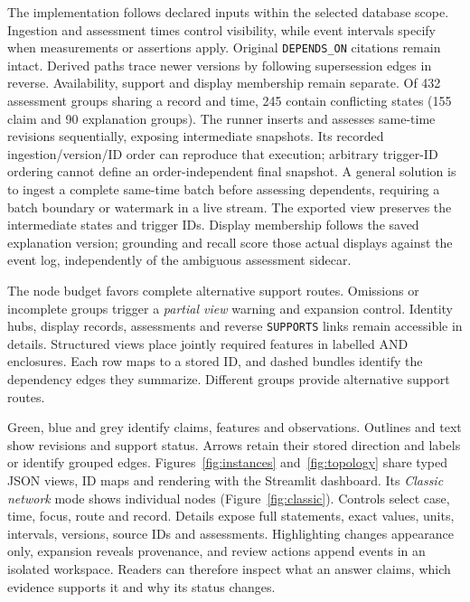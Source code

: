 \documentclass[runningheads]{llncs}
\newcommand{\SemAssessmentTies}{432}
\newcommand{\SemAssessmentConflicts}{245}
\begin{document}
The implementation follows declared inputs within the selected database
scope. Ingestion and assessment times control visibility, while event
intervals specify when measurements or assertions apply.
Original \texttt{DEPENDS\_ON} citations remain intact. Derived paths trace
newer versions by following supersession edges in reverse.
Availability, support and display membership remain separate.
Of \SemAssessmentTies{} assessment groups sharing a record and time,
\SemAssessmentConflicts{} contain conflicting states (155 claim and 90
explanation groups). The runner inserts and assesses same-time revisions
sequentially, exposing intermediate snapshots. Its recorded ingestion/version/ID
order can reproduce that execution; arbitrary trigger-ID ordering cannot define
an order-independent final snapshot. A general solution is to ingest a complete
same-time batch before assessing dependents, requiring a batch boundary or
watermark in a live stream. The exported view preserves the intermediate states
and trigger IDs. Display membership follows the saved explanation version;
grounding and recall score those actual displays against the event log,
independently of the ambiguous assessment sidecar.

The node budget favors complete alternative support routes.
Omissions or incomplete groups trigger a \emph{partial view} warning
and expansion control. Identity hubs, display records, assessments and
reverse \texttt{SUPPORTS} links remain accessible in details.
Structured views place jointly required features in labelled AND
enclosures. Each row maps to a stored ID, and dashed bundles identify
the dependency edges they summarize. Different groups provide alternative
support routes.

Green, blue and grey identify claims, features and observations.
Outlines and text show revisions and support status. Arrows retain their
stored direction and labels or identify grouped edges.
Figures~\ref{fig:instances} and~\ref{fig:topology} share typed JSON views,
ID maps and rendering with the Streamlit dashboard.
Its \emph{Classic network} mode shows individual nodes
(Figure~\ref{fig:classic}). Controls select case, time, focus, route and
record. Details expose full statements, exact values, units, intervals,
versions, source IDs and assessments. Highlighting changes appearance
only, expansion reveals provenance, and review actions append events
in an isolated workspace. Readers can therefore inspect what an answer
claims, which evidence supports it and why its status changes.
\end{document}
